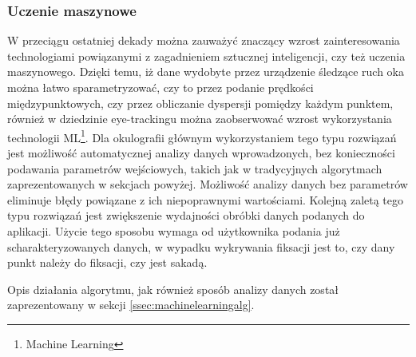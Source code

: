 \subsubsection{Uczenie maszynowe}
\label{ssec:machinelearning}
W przeciągu ostatniej dekady można zauważyć znaczący wzrost zainteresowania technologiami powiązanymi z zagadnieniem sztucznej inteligencji, czy też uczenia maszynowego. Dzięki temu, iż dane wydobyte przez urządzenie śledzące ruch oka można łatwo sparametryzować, czy to przez podanie prędkości międzypunktowych, czy przez obliczanie dyspersji pomiędzy każdym punktem, również w dziedzinie eye-trackingu można zaobserwować wzrost wykorzystania technologii ML\footnote{Machine Learning}. Dla okulografii głównym wykorzystaniem tego typu rozwiązań jest możliwość automatycznej analizy danych wprowadzonych, bez konieczności podawania parametrów wejściowych, takich jak w tradycyjnych algorytmach zaprezentowanych w sekcjach powyżej. Możliwość analizy danych bez parametrów eliminuje błędy powiązane z ich niepoprawnymi wartościami. Kolejną zaletą tego typu rozwiązań jest zwiększenie wydajności obróbki danych podanych do aplikacji. Użycie tego sposobu wymaga od użytkownika podania już scharakteryzowanych danych, w wypadku wykrywania fiksacji jest to, czy dany punkt należy do fiksacji, czy jest sakadą.\par
Opis działania algorytmu, jak również sposób analizy danych został zaprezentowany w sekcji \ref{ssec:machinelearningalg}.
